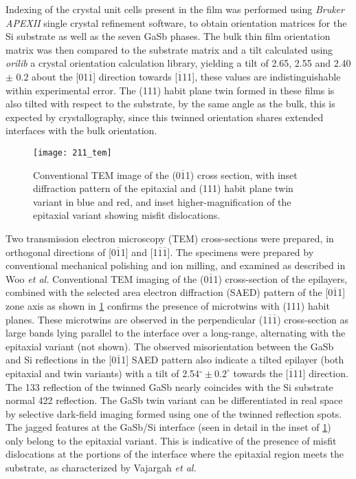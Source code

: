 Indexing of the crystal unit cells present in the film was performed using \textit{Bruker APEXII} single crystal refinement software, to obtain orientation matrices for the Si substrate as well as the seven GaSb phases.
The bulk thin film orientation matrix was then compared to the substrate matrix and a tilt calculated using \textit{orilib} a crystal orientation calculation library, yielding a tilt of 2.65\degree{}, 2.55\degree{} and 2.40\degree{} \(\pm\) 0.2\degree{} about the [01\(\overline{1}\)] direction towards [\(\overline{1}\)11], these values are indistinguishable within experimental error.
The (111) habit plane twin formed in these films is also tilted with respect to the substrate, by the same angle as the bulk, this is expected by crystallography, since this twinned orientation shares extended interfaces with the bulk orientation.
\begin{figure}
 \centering \texttt{[image: 211\_tem]}
 \caption[TEM of thin film on 211 silicon]{\label{fig:211_tem}Conventional TEM image of the (0\(\overline{1}\)1) cross section, with inset diffraction pattern of the epitaxial and (111) habit plane twin variant in blue and red, and inset higher-magnification of the epitaxial variant showing misfit dislocations.}
\end{figure}

Two transmission electron microscopy (TEM) cross-sections were prepared, in orthogonal directions of [0\(\overline{1}\)1] and
[1\(\overline{1}\overline{1}\)].
The specimens were prepared by conventional mechanical polishing and ion milling, and examined as described in Woo \textit{et al.}\cite{Woo2012} Conventional TEM imaging of the (0\(\overline{1}\)1) cross-section of the epilayers, combined with the selected area electron diffraction (SAED) pattern of the [0\(\overline{1}\)1] zone axis as shown in \cref{fig:211_tem} confirms the presence of microtwins with (111) habit planes.
These microtwins are observed in the perpendicular
(1\(\overline{1}\overline{1}\))
cross-section as large bands lying parallel to the interface over a long-range, alternating with the epitaxial variant (not shown).
The observed misorientation between the GaSb and Si reflections in the [0\(\overline{1}\)1] SAED pattern also indicate a tilted epilayer (both epitaxial and twin variants) with a tilt of 2.54\(^\circ \pm 0.2^\circ\)
towards the [\(\overline{1}\)11] direction.
The 133 reflection of the twinned GaSb nearly coincides with the Si substrate normal 422 reflection.
The GaSb twin variant can be differentiated in real space by selective dark-field imaging formed using one of the twinned reflection spots.
The jagged features at the GaSb/Si interface (seen in detail in the inset of \cref{fig:211_tem}) only belong to the epitaxial variant.
This is indicative of the presence of misfit dislocations at the portions of the interface where the epitaxial region meets the substrate, as characterized by Vajargah \textit{et al.}\cite{Vajargah2011b}
